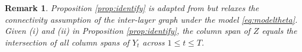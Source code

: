 \documentclass[12pt]{article}
\newtheorem{remark}{Remark}
\begin{document}



\begin{remark}
Proposition \ref{prop:identify} is adapted from \cite{macdonald2022latent} %
but 
relaxes the connectivity assumption of the inter-layer graph under the model \eqref{eq:modeltheta}. 
Given (i) and (ii) in Proposition \ref{prop:identify}, the column span of $Z$ equals the intersection of all  column spans of $Y_t$ across $1\leqslant t\leqslant T$. 
\end{remark}

\end{document}
